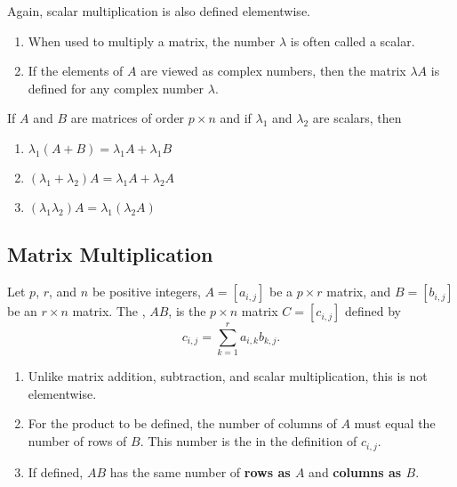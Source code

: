 Again, scalar multiplication is also defined elementwise.

\begin{remark}
  \begin{enumerate}
    \item When used to multiply a matrix, the number $\lambda$ is often called a scalar.
    \item If the elements of $A$ are viewed as complex numbers, then the matrix $\lambda A$ is defined for any complex number $\lambda$.
  \end{enumerate}
\end{remark}

\begin{theorem}
  If $A$ and $B$ are matrices of order $p \times n$ and if $\lambda_{1}$ and $\lambda_{2}$ are scalars, then
  \begin{enumerate}
    \item $\lambda_{1}(A + B) = \lambda_{1} A + \lambda_{1} B$
    \item $(\lambda_{1} + \lambda_{2})A = \lambda_{1} A + \lambda_{2} A$
    \item $(\lambda_{1} \lambda_{2})A = \lambda_{1} (\lambda_{2}A)$
  \end{enumerate}
\end{theorem}

\subsection{Matrix Multiplication}
\begin{definition}
  Let $p$, $r$, and $n$ be positive integers, $A = \left[a_{i, j}\right]$ be a $p \times r$ matrix, 
  and $B = \left[b_{i, j}\right]$ be an $r \times n$ matrix. The , $AB$, is the $p \times n$ 
  matrix $C = \left[c_{i, j}\right]$ defined by
  \begin{equation*}
    c_{i, j} = \sum^{r}_{k = 1} a_{i, k}b_{k, j}.
  \end{equation*}
\end{definition}

\begin{remark}
  \textbf{ }
  \begin{enumerate}
    \item Unlike matrix addition, subtraction, and scalar multiplication, this is not elementwise.
    \item For the product to be defined, the number of columns of $A$ must equal the number of rows of $B$.
      This number is the  in the definition of $c_{i, j}$.
    \item If defined, $AB$ has the same number of \textbf{rows as $A$} and \textbf{columns as $B$}.
  \end{enumerate}
\end{remark}

